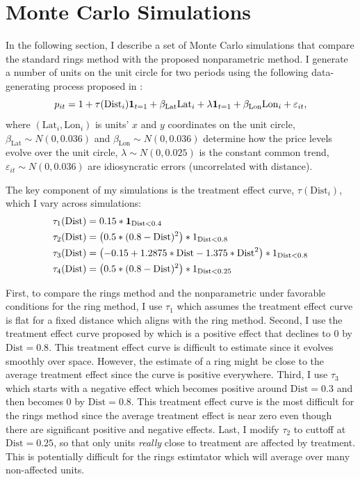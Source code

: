 \documentclass[12pt]{article}
\newcommand{\dist}{\text{Dist}}
\begin{document}
\section{Monte Carlo Simulations} \label{sec:monte}

In the following section, I describe a set of Monte Carlo simulations that compare the standard rings method with the proposed nonparametric method. I generate a number of units on the unit circle for two periods using the following data-generating process proposed in \citet{Diamond_McQuade_2019}:
\begin{equation}\label{eq:monte}
p_{it} = 1 + \tau(\dist_i) \one_{t=1} + \beta_{\text{Lat}} \text{Lat}_i + \lambda \one_{t = 1} + \beta_{\text{Lon}} \text{Lon}_i + \varepsilon_{it},
\end{equation}
where $(\text{Lat}_i, \text{Lon}_i)$ is units' $x$ and $y$ coordinates on the unit circle, $\beta_{\text{Lat}} \sim N(0, 0.036)$ and $\beta_{\text{Lon}} \sim N(0, 0.036)$ determine how the price levels evolve over the unit circle, $\lambda \sim N(0,0.025)$ is the constant common trend, $\varepsilon_{it} \sim N(0, 0.036)$ are idiosyncratic errors (uncorrelated with distance). 

The key component of my simulations is the treatment effect curve, $\tau(\dist_i)$, which I vary across simulations:
\begin{align*}
  \tau_1(\dist) &= 0.15 * \one_{\dist < 0.4} \\
  \tau_2(\dist) &= \left( 0.5 * (0.8 - \dist)^2 \right) * 1_{\dist < 0.8} \\
  \tau_3(\dist) &= \left( -0.15 + 1.2875 * \dist - 1.375 * \dist^2 \right) * 1_{\dist < 0.8} \\
  \tau_4(\dist) &= \left( 0.5 * (0.8 - \dist)^2 \right) * 1_{\dist < 0.25} \\
\end{align*}

First, to compare the rings method and the nonparametric under favorable conditions for the ring method, I use $\tau_1$ which assumes the treatment effect curve is flat for a fixed distance which aligns with the ring method. Second, I use the treatment effect curve proposed by \citet{Diamond_McQuade_2019} which is a positive effect that declines to 0 by $\dist = 0.8$. This treatment effect curve is difficult to estimate since it evolves smoothly over space. However, the estimate of a ring might be close to the average treatment effect since the curve is positive everywhere. Third, I use $\tau_3$ which starts with a negative effect which becomes positive around $\dist = 0.3$ and then becomes 0 by $\dist = 0.8$. This treatment effect curve is the most difficult for the rings method since the average treatment effect is near zero even though there are significant positive and negative effects. Last, I modify $\tau_2$ to cuttoff at $\dist = 0.25$, so that only units \emph{really} close to treatment are affected by treatment. This is potentially difficult for the rings estimtator which will average over many non-affected units.
\end{document}
